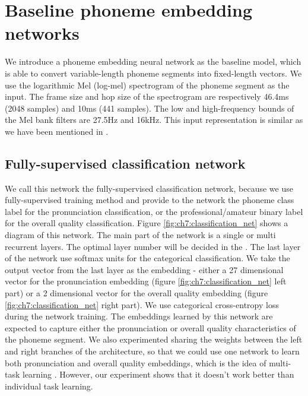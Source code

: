 \section{Baseline phoneme embedding networks}

We introduce a phoneme embedding neural network as the baseline model, which is able to convert variable-length phoneme segments into fixed-length vectors. We use the logarithmic Mel (log-mel) spectrogram of the phoneme segment as the input. The frame size and hop size of the spectrogram are respectively 46.4ms (2048 samples) and 10ms (441 samples). The low and high-frequency bounds of the Mel bank filters are 27.5Hz and 16kHz. This input representation is similar as we have been mentioned in .

\subsection{Fully-supervised classification network}

We call this network the fully-supervised classification network, because we use fully-supervised training method and provide to the network the phoneme class label for the pronunciation classification, or the professional/amateur binary label for the overall quality classification. Figure \ref{fig:ch7:classification_net} shows a diagram of this network. The main part of the network is a single or multi recurrent layers. The optimal layer number will be decided in the . The last layer of the network use softmax units for the categorical classification. We take the output vector from the last layer as the embedding - either a 27 dimensional vector for the pronunciation embedding (figure \ref{fig:ch7:classification_net} left part) or a 2 dimensional vector for the overall quality embedding (figure \ref{fig:ch7:classification_net} right part). We use categorical cross-entropy loss during the network training. The embeddings learned by this network are expected to capture either the pronunciation or overall quality characteristics of the phoneme segment. We also experimented sharing the weights between the left and right branches of the architecture, so that we could use one network to learn both pronunciation and overall quality embeddings, which is the idea of multi-task learning \cite{ruder2017overview}. However, our experiment shows that it doesn't work better than individual task learning.

